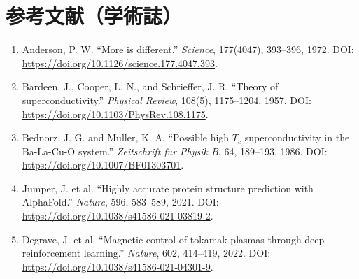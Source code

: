 \section*{参考文献（学術誌）}
\begin{enumerate}[leftmargin=2.4em]
\item Anderson, P. W. ``More is different.'' \textit{Science}, 177(4047), 393--396, 1972. DOI: \url{https://doi.org/10.1126/science.177.4047.393}.
\item Bardeen, J., Cooper, L. N., and Schrieffer, J. R. ``Theory of superconductivity.'' \textit{Physical Review}, 108(5), 1175--1204, 1957. DOI: \url{https://doi.org/10.1103/PhysRev.108.1175}.
\item Bednorz, J. G. and Muller, K. A. ``Possible high \(T_c\) superconductivity in the Ba-La-Cu-O system.'' \textit{Zeitschrift fur Physik B}, 64, 189--193, 1986. DOI: \url{https://doi.org/10.1007/BF01303701}.
\item Jumper, J. et al. ``Highly accurate protein structure prediction with AlphaFold.'' \textit{Nature}, 596, 583--589, 2021. DOI: \url{https://doi.org/10.1038/s41586-021-03819-2}.
\item Degrave, J. et al. ``Magnetic control of tokamak plasmas through deep reinforcement learning.'' \textit{Nature}, 602, 414--419, 2022. DOI: \url{https://doi.org/10.1038/s41586-021-04301-9}.
\end{enumerate}

